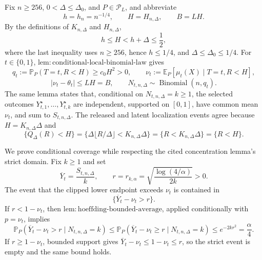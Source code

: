 Fix \(n\geq256\), \(0<\Delta\leq\Delta_0\), and \(P\in\mathcal P_L\), and abbreviate
\[
 h=h_n=n^{-1/4},\qquad H=H_{n,\Delta},\qquad B=LH.
\]
By the definitions of \(K_{n,\Delta}\) and \(H_{n,\Delta}\),
\[
 h\leq H<h+\Delta\leq\frac12,
\]
where the last inequality uses \(n\geq256\), hence \(h\leq1/4\), and \(\Delta\leq\Delta_0\leq1/4\).  For \(t\in\{0,1\}\), \(\mathrm{lem:conditional\text{-}local\text{-}binomial\text{-}law}\) gives
\[
 q_t:=\mathbb P_P(T=t,R<H)\geq c_0H^2>0,
 \qquad
 \nu_t:=\mathbb E_P[\mu_t(X)\mid T=t,R<H],
\]
\[
 |\nu_t-\theta_t|\leq LH=B,
 \qquad
 N_{t,n,\Delta}\sim\operatorname{Binomial}(n,q_t).
\]
The same lemma states that, conditional on \(N_{t,n,\Delta}=k\geq1\), the selected outcomes \(Y_{t,1}^{\star},\ldots,Y_{t,k}^{\star}\) are independent, supported on \([0,1]\), have common mean \(\nu_t\), and sum to \(S_{t,n,\Delta}\).  The released and latent localization events agree because \(H=K_{n,\Delta}\Delta\) and
\[
 \{Q_\Delta(R)<H\}
 =\{\Delta\lfloor R/\Delta\rfloor<K_{n,\Delta}\Delta\}
 =\{R<K_{n,\Delta}\Delta\}
 =\{R<H\}.
\]

We prove conditional coverage while respecting the cited concentration lemma's strict domain.  Fix \(k\geq1\) and set
\[
 \overline Y_t=\frac{S_{t,n,\Delta}}k,
 \qquad
 r=r_{k,\alpha}=\sqrt{\frac{\log(4/\alpha)}{2k}}>0.
\]
The event that the clipped lower endpoint exceeds \(\nu_t\) is contained in
\[
 \{\overline Y_t-\nu_t>r\}.
\]
If \(r<1-\nu_t\), then \(\mathrm{lem:hoeffding\text{-}bounded\text{-}average}\), applied conditionally with \(p=\nu_t\), implies
\[
 \mathbb P_P(\overline Y_t-\nu_t>r\mid N_{t,n,\Delta}=k)
 \leq\mathbb P_P(\overline Y_t-\nu_t\geq r\mid N_{t,n,\Delta}=k)
 \leq e^{-2kr^2}=\frac\alpha4.
\]
If \(r\geq1-\nu_t\), bounded support gives \(\overline Y_t-\nu_t\leq1-\nu_t\leq r\), so the strict event is empty and the same bound holds.


